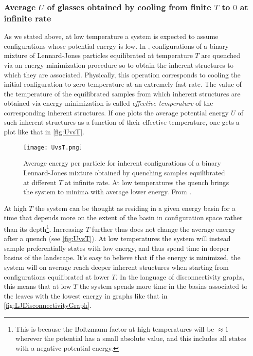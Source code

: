 \subsubsection{Average $U$ of glasses obtained by cooling from finite $T$ to $0$ at infinite rate}
As we stated above, at low temperature a system is expected to assume configurations whose potential energy is low.
In \cite{lacks2004energy}, configurations of a binary mixture of Lennard-Jones particles equilibrated at temperature $T$ are quenched via an energy minimization procedure so to obtain the inherent structures to which they are associated. Physically, this operation corresponds to cooling the initial configuration to zero temperature at an extremely fast rate.
The value of the temperature of the equilibrated samples from which inherent structures are obtained via energy minimization is called \emph{effective temperature} of the corresponding inherent structures.
If one plots the average potential energy $U$ of such inherent structures as a function of their effective temperature, one gets a plot like that in \autoref{fig:UvsT}.
\begin{figure} 
\centering 
\texttt{[image: UvsT.png]} 
\caption{Average energy per particle for inherent configurations of a binary Lennard-Jones mixture obtained by quenching samples equilibrated at different $T$ at infinite rate. At low temperatures the quench brings the system to minima with average lower energy. From \cite{lacks2004energy}. \label{fig:UvsT}}
\end{figure}
At high $T$ the system can be thought as residing in a given energy basin for a time that depends more on the extent of the basin in configuration space rather than its depth\footnote{This is because the Boltzmann factor at high temperatures will be $\approx 1$ wherever the potential has a small absolute value, and this includes all states with a negative potential energy.}. Increasing $T$ further thus does not change the average energy after a quench (see \autoref{fig:UvsT}). At low temperatures the system will instead sample preferentially states with low energy, and thus spend time in deeper basins of the landscape. It's easy to believe that if the energy is minimized, the system will on average reach deeper inherent structures when starting from configurations equilibrated at lower $T$.
In the language of disconnectivity graphs, this means that at low $T$ the system spends more time in the basins associated to the leaves with the lowest energy in graphs like that in \autoref{fig:LJDisconnectivityGraph}.

